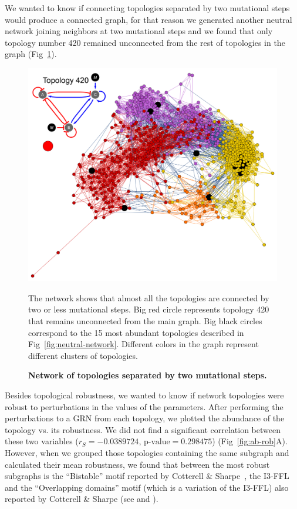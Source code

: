 \documentclass[10pt,letterpaper]{article}
\begin{document}
We wanted to know if connecting topologies separated by two mutational steps
would produce a connected graph, for that reason we generated another neutral
network joining neighbors at two mutational steps and we found that only
topology number 420 remained unconnected from the rest of topologies in the
graph (Fig~\ref{fig:2neut-net}).

\begin{figure}
 \includegraphics[width=\textwidth]{figures/results/Fig5}
 \caption{\bf Network of topologies separated by two mutational steps.}
 The network shows that almost all the topologies are connected by two or less
 mutational steps. Big red circle represents topology 420 that remains
 unconnected from the main graph. Big black circles correspond to the 15
 most abundant topologies described in Fig~\ref{fig:neutral-network}.
 Different colors in the graph represent different clusters of topologies.
 \label{fig:2neut-net}
\end{figure}

Besides topological robustness, we wanted to know if network topologies were
robust to perturbations in the values of the parameters. After performing the
perturbations to a GRN from each topology, we plotted the abundance of the
topology vs. its robustness. We did not find a significant correlation between
these two variables ($r_S = −0.0389724$, $\text{p-value} = 0.298475$)
(Fig~\ref{fig:ab-rob}A). However, when we grouped those topologies containing
the same subgraph and calculated their mean robustness, we found that between
the most robust subgraphs is the ``Bistable'' motif reported by Cotterell \&
Sharpe~\cite{Cotterell2010}, the I3-FFL and the ``Overlapping domains'' motif
(which is a variation of the I3-FFL) also reported by Cotterell \& Sharpe
(see  and ).
\end{document}
